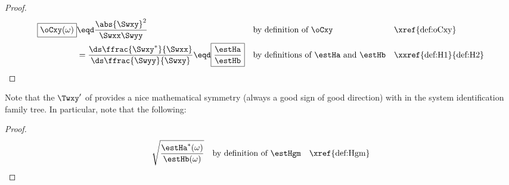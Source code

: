 \begin{proposition}
\label{prop:oCxy}
\end{proposition}
\begin{proof}
\begin{align*}
  \boxed{\oCxy(\omega)}
    &\eqd \frac{\abs{\Swxy}^2}{\Swxx\Swyy}
    && \text{by definition of $\oCxy$}
    && \text{\xref{def:oCxy}}
  \\&= \frac{\ds\ffrac{\Swxy^\ast}{\Swxx}}
            {\ds\ffrac{\Swyy}     {\Swxy}}
     \eqd \boxed{\frac{\estHa}
                      {\estHb}}
    && \text{by definitions of $\estHa$ and $\estHb$}
    && \text{\xxref{def:H1}{def:H2}}
\end{align*}
\end{proof}

\begin{remark}
\label{rem:HgmTxyCxy}
Note that the  $\Twxy'$ of 
provides a nice mathematical symmetry (always a good sign of good direction) with 
in the system identification family tree.
In particular, note that the following:
\end{remark}
\begin{proof}
\begin{align*}
  \sqrt{\frac{\estHa^\ast(\omega)}{\estHb(\omega)}}
    && \text{by definition of $\estHgm$}
    && \text{\xref{def:Hgm}}
\end{align*}
\end{proof}

